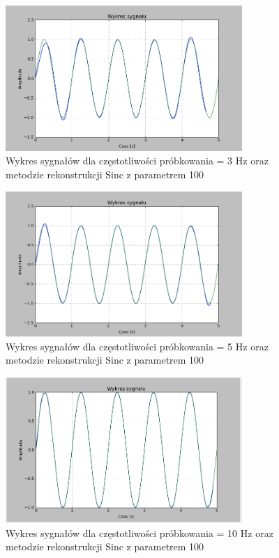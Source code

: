 \documentclass{article}
\begin{document}
    \begin{figure}[h!]
        \centering
        \includegraphics[width=0.8\textwidth]{img/1/sinc3.png}
        \caption{Wykres sygnałów dla częstotliwości próbkowania = 3 Hz oraz metodzie rekonstrukcji Sinc z parametrem 100}
    \end{figure}
    \FloatBarrier

    \begin{figure}[h!]
        \centering
        \includegraphics[width=0.8\textwidth]{img/1/sinc5.png}
        \caption{Wykres sygnałów dla częstotliwości próbkowania = 5 Hz oraz metodzie rekonstrukcji Sinc z parametrem 100}
    \end{figure}
    \FloatBarrier

    \begin{figure}[h!]
        \centering
        \includegraphics[width=0.8\textwidth]{img/1/sinc10.png}
        \caption{Wykres sygnałów dla częstotliwości próbkowania = 10 Hz oraz metodzie rekonstrukcji Sinc z parametrem 100}
    \end{figure}
    \FloatBarrier
\end{document}
